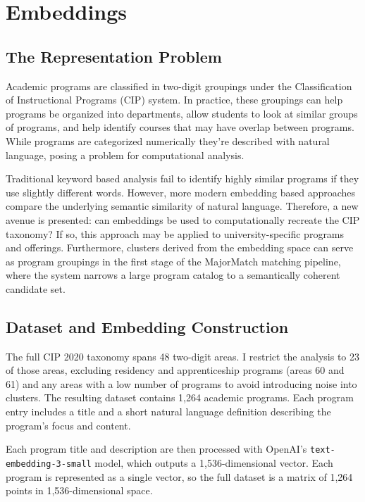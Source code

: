 
\chapter{Embeddings}


\section{The Representation Problem}

Academic programs are classified in two-digit groupings under the Classification of Instructional Programs (CIP) system. In practice, these groupings can help programs be organized into departments, allow students to look at similar groups of programs, and help identify courses that may have overlap between programs. While programs are categorized numerically they're described with natural language, posing a problem for computational analysis.

Traditional keyword based analysis fail to identify highly similar programs if they use slightly different words. However, more modern embedding based approaches compare the underlying semantic similarity of natural language. Therefore, a new avenue is presented: can embeddings be used to computationally recreate the CIP taxonomy? If so, this approach may be applied to university-specific programs and offerings. Furthermore, clusters derived from the embedding space can serve as program groupings in the first stage of the MajorMatch matching pipeline, where the system narrows a large program catalog to a semantically coherent candidate set.

\section{Dataset and Embedding Construction}

The full CIP 2020 taxonomy spans 48 two-digit areas. I restrict the analysis to 23 of those areas, excluding residency and apprenticeship programs (areas 60 and 61) and any areas with a low number of programs to avoid introducing noise into clusters. The resulting dataset contains 1,264 academic programs. Each program entry includes a title and a short natural language definition describing the program's focus and content. 

Each program title and description are then processed with OpenAI's \texttt{text-embedding-3-small} model, which outputs a 1,536-dimensional vector. Each program is represented as a single vector, so the full dataset is a matrix of 1,264 points in 1,536-dimensional space.

